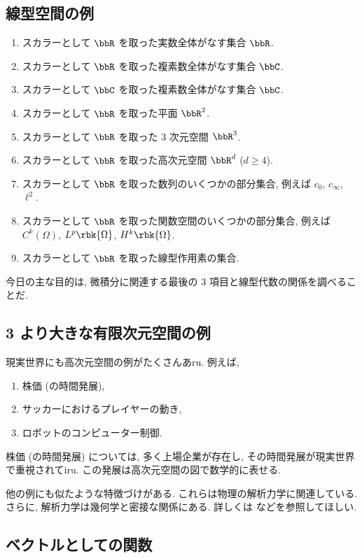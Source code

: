 \documentclass[openany, a4paper, oneside]{jsbook}
\begin{document}
\subsection{線型空間の例}

\begin{enumerate}
\item スカラーとして $\bbR$ を取った実数全体がなす集合 $\bbR$.
\item スカラーとして $\bbR$ を取った複素数全体がなす集合 $\bbC$.
\item スカラーとして $\bbC$ を取った複素数全体がなす集合 $\bbC$.
\item スカラーとして $\bbR$ を取った平面 $\bbR^2$.
\item スカラーとして $\bbR$ を取った 3 次元空間 $\bbR^3$.
\item スカラーとして $\bbR$ を取った高次元空間 $\bbR^d$ ($d \geq 4$).
\item スカラーとして $\bbR$ を取った数列のいくつかの部分集合, 例えば $c_0$, $c_{\infty}$, $\ell^2$.
\item スカラーとして $\bbR$ を取った関数空間のいくつかの部分集合, 例えば $C^k(\Omega)$, $L^p \rbk{\Omega}$, $H^k \rbk{\Omega}$.
\item スカラーとして $\bbR$ を取った線型作用素の集合.
\end{enumerate}

今日の主な目的は, 微積分に関連する最後の 3 項目と線型代数の関係を調べることだ.
\subsection{3 より大きな有限次元空間の例\label{linear-algebra-and-calculus-8}}

現実世界にも高次元空間の例がたくさんあru.
例えば,
\begin{enumerate}
\item 株価 (の時間発展),
\item サッカーにおけるプレイヤーの動き,
\item ロボットのコンピューター制御.
\end{enumerate}
株価 (の時間発展) については,
多く上場企業が存在し, その時間発展が現実世界で重視されてiru.
この発展は高次元空間の図で数学的に表せる.

他の例にも似たような特徴づけがある.
これらは物理の解析力学に関連している.
さらに, 解析力学は幾何学と密接な関係にある.
詳しくは \cite{KenjiFukaya1, NakamuraYamamoto1, NakamuraYamamoto2} などを参照してほしい.
\subsection{ベクトルとしての関数}
\end{document}
